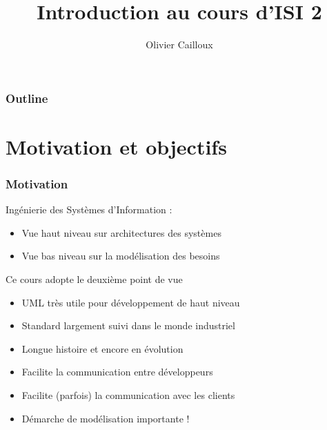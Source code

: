 \documentclass[french]{beamer}
\title{Introduction au cours d’ISI 2}
\author{Olivier Cailloux}
\institute[LAMSADE]{LAMSADE, Université Paris-Dauphine}
\begin{document}
\begin{frame}[plain]
	\titlepage
\end{frame}
\addtocounter{framenumber}{-1}

\begin{frame}
	\frametitle{Outline}
	\tableofcontents[hideallsubsections, sectionstyle=shaded/show]
\end{frame}

\section{Motivation et objectifs}
\begin{frame}
	\frametitle{Motivation}
	Ingénierie des Systèmes d’Information : 
	\begin{itemize}
		\item Vue haut niveau sur architectures des systèmes 
		\item Vue bas niveau sur la modélisation des besoins
	\end{itemize}
	Ce cours adopte le deuxième point de vue
	\begin{itemize}
		\item UML très utile pour développement de haut niveau
		\item Standard largement suivi dans le monde industriel
		\item Longue histoire et encore en évolution
		\item Facilite la communication entre développeurs
		\item Facilite (parfois) la communication avec les clients
		\item Démarche de modélisation importante !
	\end{itemize}
\end{frame}
\end{document}
